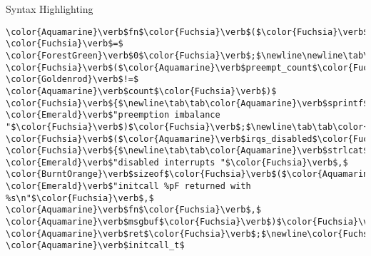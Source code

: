 \begin{frame}{Syntax Highlighting}
\begin{verbatim}
\color{Aquamarine}\verb$fn$\color{Fuchsia}\verb$($\color{Fuchsia}\verb$)$\color{Fuchsia}\verb$;$\newline\newline\tab\color{Aquamarine}\verb$msgbuf$\color{Fuchsia}\verb$[$\color{ForestGreen}\verb$0$\color{Fuchsia}\verb$]$ \color{Fuchsia}\verb$=$ \color{ForestGreen}\verb$0$\color{Fuchsia}\verb$;$\newline\newline\tab\color{BurntOrange}\verb$if$ \color{Fuchsia}\verb$($\color{Aquamarine}\verb$preempt_count$\color{Fuchsia}\verb$($\color{Fuchsia}\verb$)$ \color{Goldenrod}\verb$!=$ \color{Aquamarine}\verb$count$\color{Fuchsia}\verb$)$ \color{Fuchsia}\verb${$\newline\tab\tab\color{Aquamarine}\verb$sprintf$\color{Fuchsia}\verb$($\color{Aquamarine}\verb$msgbuf$\color{Fuchsia}\verb$,$ \color{Emerald}\verb$"preemption imbalance "$\color{Fuchsia}\verb$)$\color{Fuchsia}\verb$;$\newline\tab\tab\color{Aquamarine}\verb$preempt_count_set$\color{Fuchsia}\verb$($\color{Aquamarine}\verb$count$\color{Fuchsia}\verb$)$\color{Fuchsia}\verb$;$\newline\tab\color{Fuchsia}\verb$}$\newline\tab\color{BurntOrange}\verb$if$ \color{Fuchsia}\verb$($\color{Aquamarine}\verb$irqs_disabled$\color{Fuchsia}\verb$($\color{Fuchsia}\verb$)$\color{Fuchsia}\verb$)$ \color{Fuchsia}\verb${$\newline\tab\tab\color{Aquamarine}\verb$strlcat$\color{Fuchsia}\verb$($\color{Aquamarine}\verb$msgbuf$\color{Fuchsia}\verb$,$ \color{Emerald}\verb$"disabled interrupts "$\color{Fuchsia}\verb$,$ \color{BurntOrange}\verb$sizeof$\color{Fuchsia}\verb$($\color{Aquamarine}\verb$msgbuf$\color{Fuchsia}\verb$)$\color{Fuchsia}\verb$)$\color{Fuchsia}\verb$;$\newline\tab\tab\color{Aquamarine}\verb$local_irq_enable$\color{Fuchsia}\verb$($\color{Fuchsia}\verb$)$\color{Fuchsia}\verb$;$\newline\tab\color{Fuchsia}\verb$}$\newline\tab\color{Aquamarine}\verb$WARN$\color{Fuchsia}\verb$($\color{Aquamarine}\verb$msgbuf$\color{Fuchsia}\verb$[$\color{ForestGreen}\verb$0$\color{Fuchsia}\verb$]$\color{Fuchsia}\verb$,$ \color{Emerald}\verb$"initcall %pF returned with %s\n"$\color{Fuchsia}\verb$,$ \color{Aquamarine}\verb$fn$\color{Fuchsia}\verb$,$ \color{Aquamarine}\verb$msgbuf$\color{Fuchsia}\verb$)$\color{Fuchsia}\verb$;$\newline\newline\tab\color{Aquamarine}\verb$add_latent_entropy$\color{Fuchsia}\verb$($\color{Fuchsia}\verb$)$\color{Fuchsia}\verb$;$\newline\tab\color{BurntOrange}\verb$return$ \color{Aquamarine}\verb$ret$\color{Fuchsia}\verb$;$\newline\color{Fuchsia}\verb$}$\newline\newline\newline\color{BurntOrange}\verb$extern$ \color{Aquamarine}\verb$initcall_t$ 
\end{verbatim}
\end{frame}
